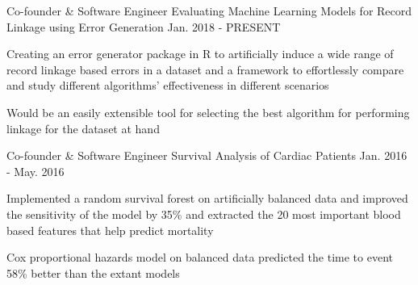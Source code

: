 \begin{cventries}

 \cventry
    {Co-founder \& Software Engineer} %
    {Evaluating Machine Learning Models for Record Linkage using Error Generation} %
    {Jan. 2018 - PRESENT} %
    {} %
    {
      \begin{cvitems} %
        \item {Creating an error generator package in R to artificially induce a wide range of record linkage based errors in a dataset and a framework to effortlessly compare and study different algorithms’ effectiveness in different scenarios}
        \item {Would be an easily extensible tool for selecting the best algorithm for performing linkage for the dataset at hand}
      \end{cvitems}
    }

\cventry
    {Co-founder \& Software Engineer} %
    {Survival Analysis of Cardiac Patients} %
    {Jan. 2016 - May. 2016} %
    {} %
    {
      \begin{cvitems} %
        \item {Implemented a random survival forest on artificially balanced data and improved the sensitivity of the model by 35\% and extracted the 20 most important blood based features that help predict mortality}
        \item {Cox proportional hazards model on balanced data predicted the time to event 58\% better than the extant models}
      \end{cvitems}
    }


\end{cventries}
